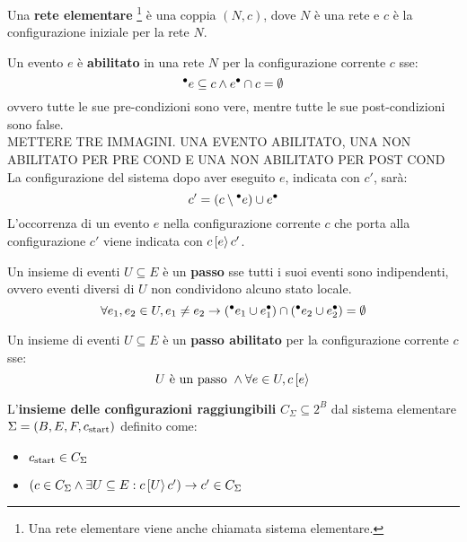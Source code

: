 \begin{defn}
    Una \textbf{rete elementare} \footnote{Una rete elementare viene anche chiamata sistema elementare.} è una coppia $(N, c)$, dove $N$ è una rete e $c$ è la configurazione iniziale per la rete $N$.
\end{defn}

\begin{defn}
    Un evento $e$ è \textbf{abilitato} in una rete $N$ per la configurazione corrente $c$ sse:
    \[
        {^\bullet}e \subseteq c \land e^\bullet \cap c = \emptyset
    \]
    ovvero tutte le sue pre-condizioni sono vere, mentre tutte le sue post-condizioni sono false.\\
    METTERE TRE IMMAGINI. UNA EVENTO ABILITATO, UNA NON ABILITATO PER PRE COND E UNA NON ABILITATO PER POST COND\\
    La configurazione del sistema dopo aver eseguito $e$, indicata con $c'$, sarà:
    \[
        c' = \left(c \setminus {^\bullet}e\right) \cup e^\bullet
    \]
    L'occorrenza di un evento $e$ nella configurazione corrente $c$ che porta alla configurazione $c'$ viene indicata con $c\,[e\rangle\,c'$.
\end{defn}

\begin{defn}
    Un insieme di eventi $U \subseteq E$ è un \textbf{passo} sse tutti i suoi eventi sono indipendenti, ovvero eventi diversi di $U$ non condividono alcuno stato locale.
    \[
        \forall e_1, e_2 \in U, e_1 \neq e_2 \rightarrow ({^\bullet}e_1 \cup e_1^\bullet) \cap ({^\bullet}e_2 \cup e_2^\bullet) = \emptyset
    \]
\end{defn}

\begin{defn}
    Un insieme di eventi $U \subseteq E$ è un \textbf{passo abilitato} per la configurazione corrente $c$ sse:
    \[
        U \textnormal{ è un passo } \land \forall e \in U, c\,[e\rangle\,
    \]
\end{defn}

\begin{defn}
    L'\textbf{insieme delle configurazioni raggiungibili} $C_{\Sigma} \subseteq 2^{B}$ dal sistema elementare $\Sigma = (B, E, F, c_{\textnormal{start}})$ definito come:
    \begin{itemize}
        \item $c_{\textnormal{start}} \in C_{\Sigma}$
        \item $\left(c \in C_{\Sigma} \land \exists U \subseteq E : c\,[U\rangle\,c'\right) \rightarrow c' \in C_{\Sigma}$
    \end{itemize}
\end{defn}

